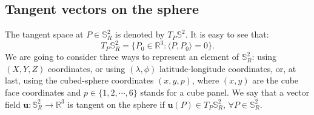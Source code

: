 \subsection{Tangent vectors on the sphere}
\label{cs-tgvectors}
The tangent space at $P \in \mathbb{S}^2_R$ is denoted by $T_P \mathbb{S}^2$.
It is easy to see that:
\begin{equation*}
	T_P\mathbb{S}^2_R = \{P_0 \in \mathbb{R}^3: \langle P,P_0\rangle = 0\}.
\end{equation*}
We are going to consider three ways to represent an element of $\mathbb{S}_R^2$:
using $(X,Y,Z)$ coordinates, or using $(\lambda, \phi)$
latitude-longitude coordinates, or, at last, using the cubed-sphere
coordinates $(x,y,p)$, where $(x,y)$ are the cube face coordinates and 
$p \in \{1,2,\cdots, 6\}$ stands for a cube panel.
We say that a vector field $\boldsymbol{u}: \mathbb{S}^2_R \to 
\mathbb{R}^3$ is tangent on  the sphere if
$\boldsymbol{u}(P) \in T_P\mathbb{S}^2_R$, $\forall P \in \mathbb{S}^2_R$.

